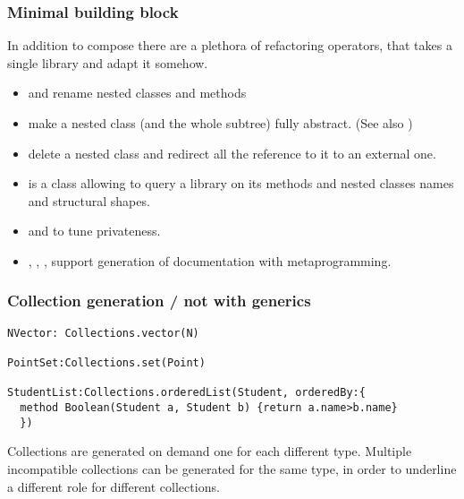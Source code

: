 \begin{frame}[fragile]
\frametitle{Minimal building block}

In addition to compose there are a plethora of \alert{refactoring} operators, that takes a single library and adapt it somehow.
\begin{itemize}
\PresentationOnly\pause\item \Q@RenamePath@ and \Q@RenameSelector@ rename nested classes and methods
\PresentationOnly\pause\item \Q@RemoveImplementationPath@  make a nested class (and the whole subtree) fully abstract. (See also \Q@RemoveImplementationSelector@)
\PresentationOnly\pause\item \Q@Redirect@ delete a  nested class and redirect all the reference to it to an external one.
\PresentationOnly\pause\item \Q@Introspect@ is a class allowing to query a library on its methods and nested classes names and structural shapes.
\PresentationOnly\pause\item \Q@MakePrivatePath@ and \Q@MakePrivateSelector@ to tune privateness.
\PresentationOnly\pause\item \Q@AddDocumentationPath@, \Q@AddDocumentationSelector@, \Q@RemoveDocumentationPath@, \Q@RemoveDocumentationSelector@
support generation of documentation with metaprogramming.
\end{itemize}
\end{frame}


\begin{frame}[fragile]
\frametitle{Collection generation / not with generics}
\begin{NiceCode}{59ex}{0.8}
\begin{lstlisting}
NVector: Collections.vector(N)

PointSet:Collections.set(Point)

StudentList:Collections.orderedList(Student, orderedBy:{
  method Boolean(Student a, Student b) {return a.name>b.name}
  })
\end{lstlisting}
\end{NiceCode}
Collections are generated on demand one for each different type.
Multiple incompatible collections can be generated for the same type, in order to underline a different role for different collections.
\end{frame}

